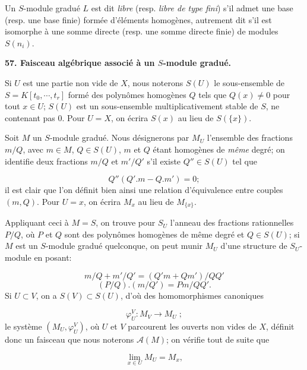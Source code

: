 Un $S$-module gradué $L$ est dit \textit{libre} (resp. \textit{libre de type fini}) s'il admet une base (resp. une base finie) formée d'éléments homogènes, autrement dit s'il est isomorphe à une somme directe (resp. une somme directe finie) de modules $S(n_i)$.


\textbf{57. Faisceau algébrique associé à un $S$-module gradué.}

Si $U$ est une partie non vide de $X$, nous noterons $S(U)$ le sous-ensemble de $S = K[t_0 , \cdots , t_r]$ formé des polynômes homogènes $Q$ tels que $Q(x) \neq 0$ pour tout $x \in U$; $S(U)$ est un sous-ensemble multiplicativement stable de $S$, ne contenant pas 0. Pour $U = X$, on écrira $S(x)$ au lieu de $S(\{x\})$.

Soit $M$ un $S$-module gradué. Nous désignerons par $M_U$ l'ensemble des fractions $m/Q$, avec $m \in M$, $Q \in S(U)$, $m$ et $Q$ étant homogènes de \textit{même} degré; on identifie deux fractions $m/Q$ et $m'/Q'$ s'il existe $Q'' \in S(U)$ tel que

\begin{equation*}
Q''(Q'.m - Q.m') = 0;
\end{equation*}
il est clair que l'on définit bien ainsi une relation d'équivalence entre couples $(m, Q)$. Pour $U = x$, on écrira $M_x$ au lieu de $M_{\{x\}}$.

Appliquant ceci à $M = S$, on trouve pour $S_U$ l'anneau des fractions rationnelles $P/Q$, où $P$ et $Q$ sont des polynômes homogènes de même degré et $Q \in S(U)$; si $M$ est un $S$-module gradué quelconque, on peut munir $M_U$ d'une structure de $S_U$-module en posant:

\begin{equation*}
m/Q + m'/Q' = (Q'm + Qm')/QQ'
\end{equation*}
\begin{equation*}
(P/Q).(m/Q') = Pm/QQ'.
\end{equation*}
Si $U \subset V$, on a $S(V) \subset S(U)$, d'où des homomorphismes canoniques

\begin{equation*}
\varphi_U^V : M_V \to M_U \; ;
\end{equation*}
le système $(M_U , \varphi_U^V)$, où $U$ et $V$ parcourent les ouverts non vides de $X$, définit donc un faisceau que nous noterons $\mathcal{A}(M)$; on vérifie tout de suite que

\begin{equation*}
\lim_{x \in U} M_U = M_x ,
\end{equation*}


